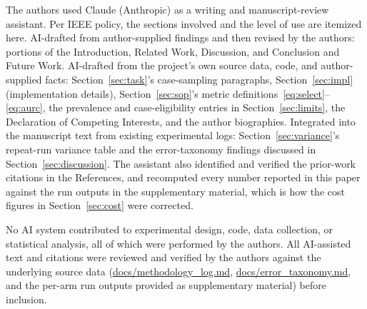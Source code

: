 \documentclass[]{ieeeaccess}
\newcommand{\code}[1]{\url{#1}}
\begin{document}
The authors used Claude (Anthropic) \cite{claude2026} as a writing and
manuscript-review assistant. Per IEEE policy, the sections involved and
the level of use are itemized here. AI-drafted from author-supplied
findings and then revised by the authors: portions of the Introduction,
Related Work, Discussion, and Conclusion and Future Work.
AI-drafted from the project's own source data, code, and
author-supplied facts: Section~\ref{sec:task}'s case-sampling
paragraphs, Section~\ref{sec:impl} (implementation details),
Section~\ref{sec:sop}'s metric definitions~\eqref{eq:select}--\eqref{eq:aurc},
the prevalence and case-eligibility entries in Section~\ref{sec:limits},
the Declaration of Competing Interests, and the author biographies.
Integrated into the manuscript text from existing experimental logs:
Section~\ref{sec:variance}'s repeat-run variance table and the
error-taxonomy findings discussed in Section~\ref{sec:discussion}. The
assistant also identified and verified the prior-work citations in the
References, and recomputed every number reported in this paper against
the run outputs in the supplementary material, which is how the cost
figures in Section~\ref{sec:cost} were corrected.

No AI system contributed to experimental design, code, data collection,
or statistical analysis, all of which were performed by the authors.
All AI-assisted text and citations were reviewed and verified by the
authors against the underlying source data
(\code{docs/methodology_log.md}, \code{docs/error_taxonomy.md}, and the
per-arm run outputs provided as supplementary material) before
inclusion.
\end{document}
